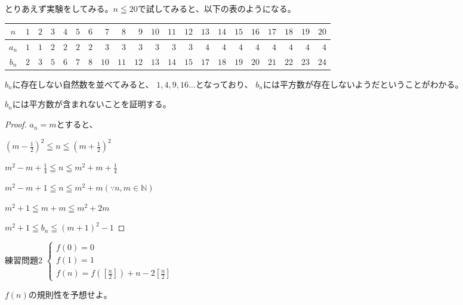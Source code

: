 \documentclass[uplatex,fleqn]{jsbook}
\begin{document}
\begin{answer}
    とりあえず実験をしてみる。$n\leqq 20$で試してみると、以下の表のようになる。

    \begin{table}[h]
        \begin{center}
            \begin{tabular}{|c||r|r|r|r|r|r|r|r|r|r|r|r|r|r|r|r|r|r|r|r|}
                \hline
                $n$ & $1$ & $2$ & $3$ & $4$ & $5$ & $6$ & $7$ & $8$ & $9$ & $10$ & $11$ & $12$ & $13$ & $14$ & $15$ & $16$ & $17$ & $18$ & $19$ & $20$\\\hline
                $a_n$ & $1$ & $1$ & $2$ & $2$ & $2$ & $2$ & $3$ & $3$ & $3$ & $3$ & $3$ & $3$ & $4$ & $4$ & $4$ & $4$ & $4$ & $4$ & $4$ & $4$\\\hline
                $b_n$ & $2$ & $3$ & $5$ & $6$ & $7$ & $8$ & $10$ & $11$ & $12$ & $13$ & $14$ & $15$ & $17$ & $18$ & $19$ & $20$ & $21$ & $22$ & $23$ & $24$\\\hline
            \end{tabular}
        \end{center}
    \end{table}

    $b_n$に存在しない自然数を並べてみると、
    $1,4,9,16\dots$となっており、
    $b_n$には平方数が存在しないようだということがわかる。

    $b_n$には平方数が含まれないことを証明する。

    \begin{proof}
        $a_n=m$とすると、

        $\displaystyle \left(m-\frac{1}{2}\right) ^2\leqq n\leqq \left(m+\frac{1}{2}\right) ^2$

        $\displaystyle m^2-m+\frac{1}{4}\leqq n \leqq m^2+m+\frac{1}{4}$

        $\displaystyle m^2-m+1\leqq n \leqq m^2+m \left(\because n,m \in \mathbb{N}\right)$

        $m^2+1\leqq m+m \leqq m^2+2m$

        $m^2+1\leqq b_n \leqq \left(m+1\right)^2-1$

    \end{proof}

\end{answer}

\begin{problem}{練習問題2}
    \begin{math}
        \begin{cases}
            f\left(0\right)=0\\
            f\left(1\right)=1\\
            \displaystyle f\left(n\right)=f\left(\left[\frac{n}{2}\right]\right)+n-2\left[\frac{n}{2}\right]
        \end{cases}
    \end{math}

    $f\left(n\right)$の規則性を予想せよ。
\end{problem}
\end{document}
